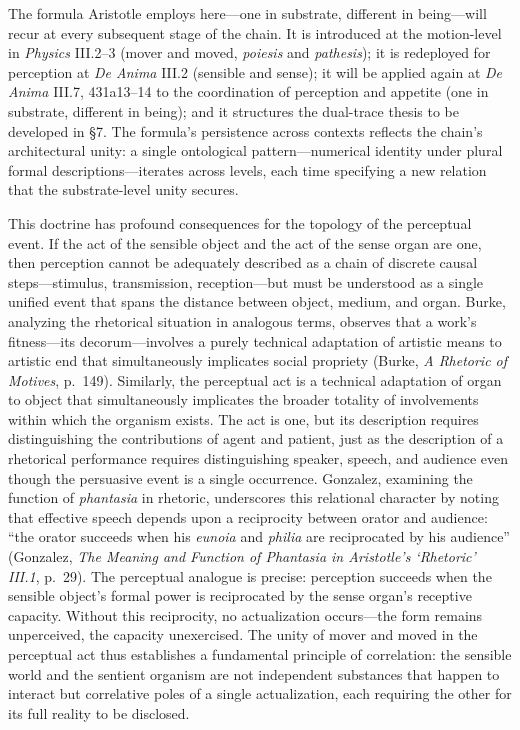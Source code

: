 \documentclass[12pt]{article}
\begin{document}
The formula Aristotle employs here---one in substrate, different in being---will recur at every subsequent stage of the chain. It is introduced at the motion-level in \textit{Physics} III.2--3 (mover and moved, \textit{poiesis} and \textit{pathesis}); it is redeployed for perception at \textit{De Anima} III.2 (sensible and sense); it will be applied again at \textit{De Anima} III.7, 431a13--14 to the coordination of perception and appetite (one in substrate, different in being); and it structures the dual-trace thesis to be developed in §7. The formula's persistence across contexts reflects the chain's architectural unity: a single ontological pattern---numerical identity under plural formal descriptions---iterates across levels, each time specifying a new relation that the substrate-level unity secures.

This doctrine has profound consequences for the topology of the perceptual event. If the act of the sensible object and the act of the sense organ are one, then perception cannot be adequately described as a chain of discrete causal steps---stimulus, transmission, reception---but must be understood as a single unified event that spans the distance between object, medium, and organ. Burke, analyzing the rhetorical situation in analogous terms, observes that a work's fitness---its decorum---involves a purely technical adaptation of artistic means to artistic end that simultaneously implicates social propriety (Burke, \textit{A Rhetoric of Motives}, p.~149). Similarly, the perceptual act is a technical adaptation of organ to object that simultaneously implicates the broader totality of involvements within which the organism exists. The act is one, but its description requires distinguishing the contributions of agent and patient, just as the description of a rhetorical performance requires distinguishing speaker, speech, and audience even though the persuasive event is a single occurrence. Gonzalez, examining the function of \textit{phantasia} in rhetoric, underscores this relational character by noting that effective speech depends upon a reciprocity between orator and audience: ``the orator succeeds when his \textit{eunoia} and \textit{philia} are reciprocated by his audience'' (Gonzalez, \textit{The Meaning and Function of Phantasia in Aristotle's `Rhetoric' III.1}, p.~29). The perceptual analogue is precise: perception succeeds when the sensible object's formal power is reciprocated by the sense organ's receptive capacity. Without this reciprocity, no actualization occurs---the form remains unperceived, the capacity unexercised. The unity of mover and moved in the perceptual act thus establishes a fundamental principle of correlation: the sensible world and the sentient organism are not independent substances that happen to interact but correlative poles of a single actualization, each requiring the other for its full reality to be disclosed.
\end{document}
